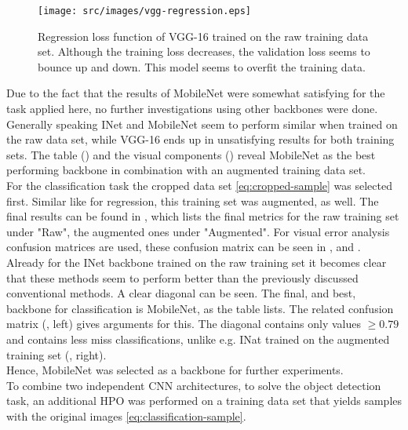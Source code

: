 \begin{figure}[!ht]
    \centering
    \texttt{[image: src/images/vgg-regression.eps]}
    \caption{Regression loss function of VGG-16 trained on the raw training data set. Although the training loss  decreases, the validation loss  seems to bounce up and down. This model seems to overfit the training data.}
    \label{fig:reg-vgg-loss}
\end{figure}

Due to the fact that the results of MobileNet were somewhat satisfying for the task applied here, no further investigations using other backbones were done.
Generally speaking INet and MobileNet seem to perform similar when trained on the raw data set, while VGG-16 ends up in unsatisfying results for both training sets.
The table () and the visual components () reveal MobileNet as the best performing backbone in combination with an augmented training data set.\\
For the classification task the cropped data set \eqref{eq:cropped-sample} was selected first.
Similar like for regression, this training set was augmented, as well.
The final results can be found in , which lists the final metrics for the raw training set under "Raw", the augmented ones under "Augmented".
For visual error analysis confusion matrices are used, these confusion matrix can be seen in ,  and .
Already for the INet backbone trained on the raw training set it becomes clear that these methods seem to perform better than the previously discussed conventional methods.
A clear diagonal can be seen.
The final, and best, backbone for classification is MobileNet, as the table lists.
The related confusion matrix (, left) gives arguments for this. The diagonal contains only values $\geq 0.79$ and contains less miss classifications, unlike e.g. INat trained on the augmented training set (, right).\\
Hence, MobileNet was selected as a backbone for further experiments.\\\newline
To combine two independent CNN architectures, to solve the object detection task, an additional HPO was performed on a training data set that yields samples with the original images \eqref{eq:classification-sample}.
